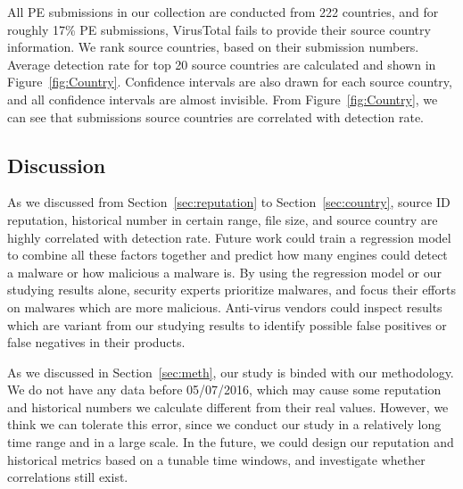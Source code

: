 All PE submissions in our collection are conducted from 222 countries, 
and for roughly 17\% PE submissions, 
VirusTotal fails to provide their source country information. 
We rank source countries, based on their submission numbers. 
Average detection rate for top 20 source countries are calculated and shown in 
Figure~\ref{fig:Country}. 
Confidence intervals are also drawn for each source country, 
and all confidence intervals are almost invisible. 
From Figure~\ref{fig:Country}, 
we can see that submissions source countries are correlated with detection rate.

\subsection{Discussion}

As we discussed from Section~\ref{sec:reputation} to Section~\ref{sec:country}, 
source ID reputation, historical number in certain range, file size, 
and source country are highly correlated with detection rate. 
Future work could train a regression model to combine all these factors together and 
predict how many engines could detect a malware or how malicious a malware is. 
By using the regression model or our studying results alone, 
security experts prioritize malwares, and focus their efforts on malwares which are more malicious. 
Anti-virus vendors could inspect results which are variant from our studying results 
to identify possible false positives or false negatives in their products. 

As we discussed in Section~\ref{sec:meth}, our study is binded with our methodology.
We do not have any data before 05/07/2016, 
which may cause some reputation and historical numbers 
we calculate different from their real values. 
However, we think we can tolerate this error, 
since we conduct our study in a relatively long time range and in a large scale. 
In the future, we could design our reputation and historical metrics based on a tunable time windows, and investigate whether correlations still exist.   
